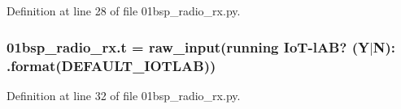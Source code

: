 Definition at line 28 of file 01bsp\+\_\+radio\+\_\+rx.\+py.

\subsubsection[{\texorpdfstring{t}{t}}]{\setlength{\rightskip}{0pt plus 5cm}01bsp\+\_\+radio\+\_\+rx.\+t = raw\+\_\+input(\textquotesingle{}running IoT-\/l\+AB? (Y$\vert$N)\+: \textquotesingle{}.format({\bf D\+E\+F\+A\+U\+L\+T\+\_\+\+I\+O\+T\+L\+AB}))}\hypertarget{namespace01bsp__radio__rx_a1e8eff7facf7d42348b520b3ff8525f3}{}\label{namespace01bsp__radio__rx_a1e8eff7facf7d42348b520b3ff8525f3}


Definition at line 32 of file 01bsp\+\_\+radio\+\_\+rx.\+py.

